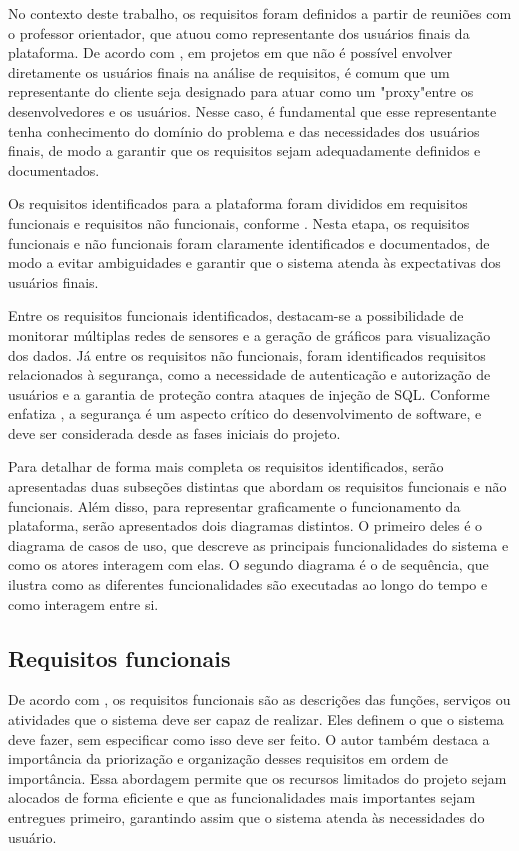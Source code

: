 \documentclass[tcc,capa]{texufpel}
\begin{document}
No contexto deste trabalho, os requisitos foram definidos a partir de reuniões com o professor orientador, que atuou como representante dos usuários finais da plataforma. De acordo com \citet{PRESSMAN:2016}, em projetos em que não é possível envolver diretamente os usuários finais na análise de requisitos, é comum que um representante do cliente seja designado para atuar como um "proxy"\space entre os desenvolvedores e os usuários. Nesse caso, é fundamental que esse representante tenha conhecimento do domínio do problema e das necessidades dos usuários finais, de modo a garantir que os requisitos sejam adequadamente definidos e documentados.

Os requisitos identificados para a plataforma foram divididos em requisitos funcionais e requisitos não funcionais, conforme \citet{ghezzi:2003}. Nesta etapa, os requisitos funcionais e não funcionais foram claramente identificados e documentados, de modo a evitar ambiguidades e garantir que o sistema atenda às expectativas dos usuários finais.

Entre os requisitos funcionais identificados, destacam-se a possibilidade de monitorar múltiplas redes de sensores e a geração de gráficos para visualização dos dados. Já entre os requisitos não funcionais, foram identificados requisitos relacionados à segurança, como a necessidade de autenticação e autorização de usuários e a garantia de proteção contra ataques de injeção de SQL. Conforme enfatiza \citet{bass:2003}, a segurança é um aspecto crítico do desenvolvimento de software, e deve ser considerada desde as fases iniciais do projeto.

Para detalhar de forma mais completa os requisitos identificados, serão apresentadas duas subseções distintas que abordam os requisitos funcionais e não funcionais. Além disso, para representar graficamente o funcionamento da plataforma, serão apresentados dois diagramas distintos. O primeiro deles é o diagrama de casos de uso, que descreve as principais funcionalidades do sistema e como os atores interagem com elas. O segundo diagrama é o de sequência, que ilustra como as diferentes funcionalidades são executadas ao longo do tempo e como interagem entre si.

\subsection{Requisitos funcionais}
De acordo com \citet{PRESSMAN:2016}, os requisitos funcionais são as descrições das funções, serviços ou atividades que o sistema deve ser capaz de realizar. Eles definem o que o sistema deve fazer, sem especificar como isso deve ser feito. O autor também destaca a importância da priorização e organização desses requisitos em ordem de importância. Essa abordagem permite que os recursos limitados do projeto sejam alocados de forma eficiente e que as funcionalidades mais importantes sejam entregues primeiro, garantindo assim que o sistema atenda às necessidades do usuário.
\end{document}
